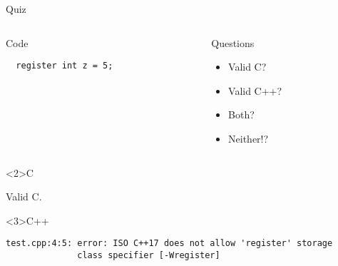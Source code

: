 \documentclass[presentation,aspectratio=169]{beamer}
\begin{document}
\begin{frame}[fragile,label={sec:org23c4234}]{Quiz}
\begin{columns}
\begin{column}{0.48\columnwidth}
\begin{block}{Code}
\begin{verbatim}
  register int z = 5;
\end{verbatim}
\end{block}
\end{column}

\begin{column}{0.48\columnwidth}
\begin{block}{Questions}
\begin{itemize}
\item Valid C?
\item Valid C++?
\item Both?
\item Neither!?
\end{itemize}
\end{block}
\end{column}
\end{columns}

\begin{block}<2>{C}

Valid C.

\end{block}
\vspace{-1cm}
\begin{block}<3>{C++}
\begin{verbatim}
test.cpp:4:5: error: ISO C++17 does not allow 'register' storage
              class specifier [-Wregister]
\end{verbatim}
\end{block}
\end{frame}

\end{document}
